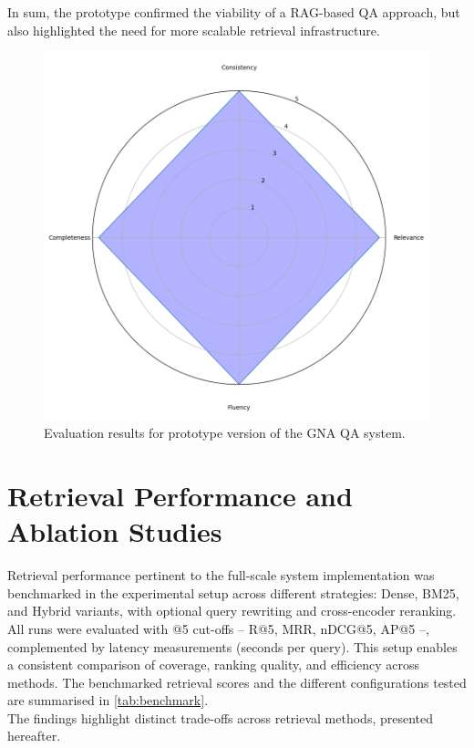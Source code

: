 \begin{spacing}{1.5}
In sum, the prototype confirmed the viability of a RAG-based QA approach, but also highlighted the need for more scalable retrieval infrastructure.

\begin{figure}[H]
  \centering
  \includegraphics[width=\textwidth]{images/radar.png} 
  \caption{Evaluation results for prototype version of the GNA QA system.}
  \label{fig:proto_results}
\end{figure}


\section{Retrieval Performance and Ablation Studies}\label{sec:retrieval_ablation}
Retrieval performance pertinent to the full-scale system implementation was benchmarked in the experimental setup across different strategies: Dense, BM25, and Hybrid variants, with optional query rewriting and cross-encoder reranking. All runs were evaluated with @5 cut-offs -- R@5, MRR, nDCG@5, AP@5 --, complemented by latency measurements (seconds per query). This setup enables a consistent comparison of coverage, ranking quality, and efficiency across methods. The benchmarked retrieval scores and the different configurations tested are summarised in \autoref{tab:benchmark}.\\

\noindent The findings highlight distinct trade-offs across retrieval methods, presented hereafter.\\


\end{spacing}
